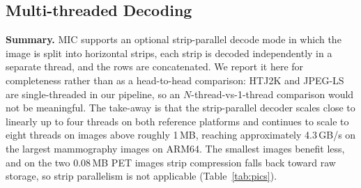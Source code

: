 \documentclass[journal]{IEEEtran}
\begin{document}
\subsection{Multi-threaded Decoding}
\label{subsec:multithread}

\textbf{Summary.} MIC supports an optional strip-parallel decode mode in
which the image is split into horizontal strips, each strip is decoded
independently in a separate thread, and the rows are concatenated. We
report it here for completeness rather than as a head-to-head comparison:
HTJ2K and JPEG-LS are single-threaded in our pipeline, so an
$N$-thread-vs-1-thread comparison would not be meaningful. The
take-away is that the strip-parallel decoder scales close to linearly
up to four threads on both reference platforms and continues to scale
to eight threads on images above roughly 1\,MB, reaching approximately
4.3\,GB/s on the largest mammography images on ARM64. The smallest
images benefit less, and on the two 0.08\,MB PET images strip
compression falls back toward raw storage, so strip parallelism is not
applicable (Table~\ref{tab:pics}).
\end{document}
